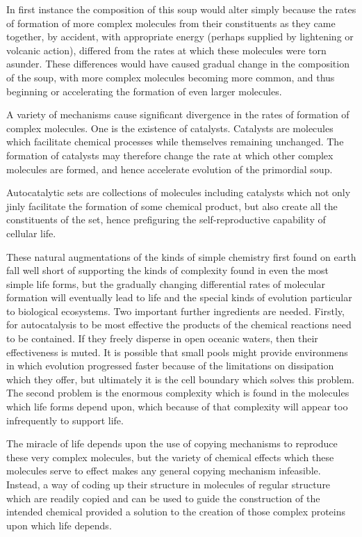 In first instance the composition of this soup would alter simply because the rates of formation of more complex molecules from their constituents as they came together, by accident, with appropriate energy (perhaps supplied by lightening or volcanic action), differed from the rates at which these molecules were torn asunder.
These differences would have caused gradual change in the composition of the soup, with more complex molecules becoming more common, and thus beginning or accelerating the formation of even larger molecules.

A variety of mechanisms cause significant divergence in the rates of formation of complex molecules.
One is the existence of catalysts.
Catalysts are molecules which facilitate chemical processes while themselves remaining unchanged.
The formation of catalysts may therefore change the rate at which other complex molecules are formed, and hence accelerate evolution of the primordial soup.

Autocatalytic sets are collections of molecules including catalysts which not only jinly facilitate the formation of some chemical product, but also create all the constituents of the set, hence prefiguring the self-reproductive capability of cellular life.

These natural augmentations of the kinds of simple chemistry first found on earth fall well short of supporting the kinds of complexity found in even the most simple life forms, but the gradually changing differential rates of molecular formation will eventually lead to life and the special kinds of evolution particular to biological ecosystems.
Two important further ingredients are needed.
Firstly, for autocatalysis to be most effective the products of the chemical reactions need to be contained.
If they freely disperse in open oceanic waters, then their effectiveness is muted.
It is possible that small pools might provide environmens in which evolution progressed faster because of the limitations on dissipation which they offer, but ultimately it is the cell boundary which solves this problem.
The second problem is the enormous complexity which is found in the molecules which life forms depend upon, which because of that complexity will appear too infrequently to support life.

The miracle of life depends upon the use of copying mechanisms to reproduce these very complex molecules, but the variety of chemical effects which these molecules serve to effect makes any general copying mechanism infeasible.
Instead, a way of coding up their structure in molecules of regular structure which are readily copied and can be used to guide the construction of the intended chemical provided a solution to the creation of those complex proteins upon which life depends.

